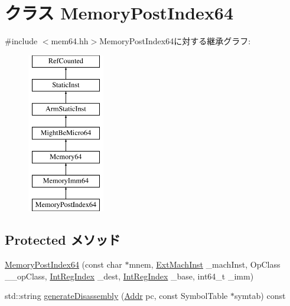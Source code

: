 \hypertarget{classArmISA_1_1MemoryPostIndex64}{
\section{クラス MemoryPostIndex64}
\label{classArmISA_1_1MemoryPostIndex64}
}


{\ttfamily \#include $<$mem64.hh$>$}MemoryPostIndex64に対する継承グラフ:\begin{figure}[H]
\begin{center}
\leavevmode
\includegraphics[height=7cm]{classArmISA_1_1MemoryPostIndex64}
\end{center}
\end{figure}
\subsection*{Protected メソッド}
\begin{DoxyCompactItemize}
\item 
\hyperlink{classArmISA_1_1MemoryPostIndex64_a16d28eb4ba77d718ecd9964631480205}{MemoryPostIndex64} (const char $\ast$mnem, \hyperlink{classStaticInst_a5605d4fc727eae9e595325c90c0ec108}{ExtMachInst} \_\-machInst, OpClass \_\-\_\-opClass, \hyperlink{namespaceArmISA_ae64680ba9fb526106829d6bf92fc791b}{IntRegIndex} \_\-dest, \hyperlink{namespaceArmISA_ae64680ba9fb526106829d6bf92fc791b}{IntRegIndex} \_\-base, int64\_\-t \_\-imm)
\item 
std::string \hyperlink{classArmISA_1_1MemoryPostIndex64_a95d323a22a5f07e14d6b4c9385a91896}{generateDisassembly} (\hyperlink{classm5_1_1params_1_1Addr}{Addr} pc, const SymbolTable $\ast$symtab) const 
\end{DoxyCompactItemize}


